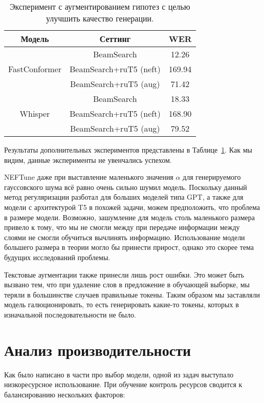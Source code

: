 \begin{table}[]
\centering
\caption{Эксперимент с аугментированием гипотез с целью улучшить качество генерации.}
\begin{tabular}{|c|c|c|}
\hline
Модель                         & Сеттинг                              & WER     \\ \hline
\multirow{3}{*}{FastConformer} & BeamSearch                           & 12.26   \\ \cline{2-3} 
                               & BeamSearch+ruT5 (neft)               & 169.94  \\ \cline{2-3} 
                               & BeamSearch+ruT5 (aug)                & 71.42   \\ \hline
\multirow{3}{*}{Whisper}       & BeamSearch                           & 18.33   \\ \cline{2-3} 
                               & BeamSearch+ruT5 (neft)               & 168.90  \\ \cline{2-3} 
                               & BeamSearch+ruT5 (aug)                & 79.52   \\ \hline
\end{tabular}
\label{tab:fails}
\end{table}

Результаты дополнительных экспериментов представлены в Таблице~\ref{tab:fails}.
Как мы видим, данные эксперименты не увенчались успехом.

NEFTune даже при выставление маленького значения $\alpha$ для генерируемого гауссовского шума всё равно очень сильно шумил модель.
Поскольку данный метод регуляризации разботал для больших моделей типа GPT\cite{jain2023neftune}, а также для модели с архитектурой T5 в похожей задачи\cite{iudinenhancing}, можем предположить, что проблема в размере модели.
Возможно, зашумление для модель столь маленького размера привело к тому, что мы не смогли между при передаче информации между слоями не смогли обучиться вычлинять информацию.
Использование модели большего размера в теории могло бы принести прирост, однако это скорее тема будущих исследований проблемы.

Текстовые аугментации также принесли лишь рост ошибки.
Это может быть вызвано тем, что при удаление слов в предложение в обучающей выборке, мы теряли в большинстве случаев правильные токены.
Таким образом мы заставляли модель галюционировать, то есть генерировать какие-то токены, которых в изначальной последовательности не было.

\section{Анализ производительности}
Как было написано в части про выбор модели, одной из задач выступало низкоресурсное использование.
При обучение контроль ресурсов сводится к балансированию нескольких факторов:

